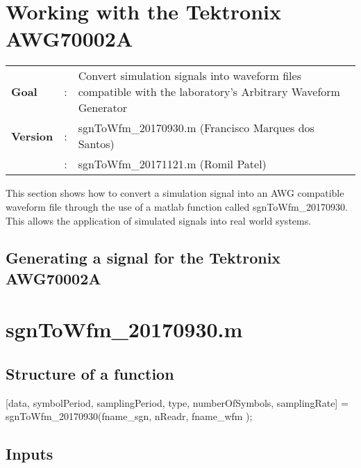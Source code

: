 \clearpage
\section{Working with the Tektronix AWG70002A}

\begin{tcolorbox}	
	\begin{tabular}{p{2.75cm} p{0.2cm} p{10.5cm}} 	
		\textbf{Goal}           &:& Convert simulation signals into waveform files compatible with the laboratory's Arbitrary Waveform Generator\\
		\textbf{Version}        &:& sgnToWfm\_20170930.m (Francisco Marques dos Santos)\\
							    &:& sgnToWfm\_20171121.m (Romil Patel)
	\end{tabular}
\end{tcolorbox}


This section shows how to convert a simulation signal into an AWG compatible waveform file through the use of a matlab function called sgnToWfm\_20170930. This allows the application of simulated signals into real world systems.
\subsection{Generating a signal for the Tektronix AWG70002A}

\section*{sgnToWfm\_20170930.m}

\subsection*{Structure of a function}

[data, symbolPeriod, samplingPeriod, type, numberOfSymbols, samplingRate] = sgnToWfm\_20170930(fname\_sgn, nReadr, fname\_wfm );

\subsection*{Inputs}


